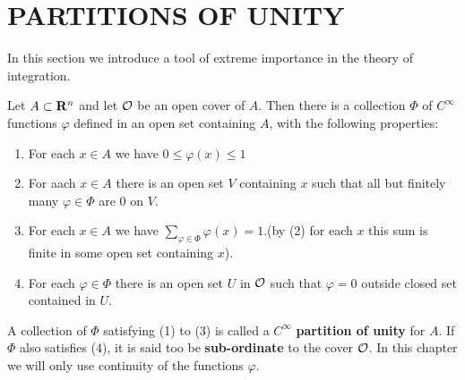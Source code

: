\clearpage
\section{PARTITIONS OF UNITY}
In this section we introduce a tool of extreme importance in
the theory of integration.

\begin{theorem}
    Let $A \subset \mathbf{R}^n$ and let $\mathcal{O}$ be an open cover of $A$.
    Then there is a collection $\Phi$ of $C^\infty$ functions $\varphi$ defined in an open
    set containing $A$, with the following properties:
    \begin{enumerate}[label=\upshape{(\arabic*)}]
        \item For each $x\in A$ we have $0\le \varphi(x)\le 1$ 
        \item For aach $x\in A$ there is an open set $V$ containing $x$ such that 
            all but finitely many $\varphi\in \Phi$ are 0 on $V$.
        \item For each $x\in A$ we have $\sum_{\varphi\in \Phi}\varphi(x)=1$.(by (2) for each 
            $x$ this sum is finite in some open set containing $x$).
        \item For each $\varphi\in \Phi$ there is an open set $U$ in $\mathcal{O}$ 
            such that $\varphi=0$ outside closed set contained in $U$. 
    \end{enumerate}
\end{theorem}

A collection of $\Phi$ satisfying (1) to (3) is called a $C^\infty$ \textbf{partition of unity}
for $A$. If $\Phi$ also satisfies (4), it is said too be \textbf{sub-ordinate} to the cover $\mathcal{O}$.
In this chapter we will only use continuity of the functions $\varphi$.

